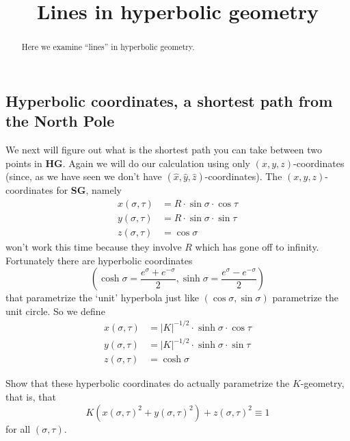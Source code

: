 \documentclass{ximera}
\title{Lines in hyperbolic geometry}
\begin{document}
\begin{abstract}
Here we examine ``lines'' in hyperbolic geometry.
\end{abstract}
\maketitle

\subsection*{Hyperbolic coordinates, a shortest path from the North Pole}

We next will figure out what is the shortest path you can take between
two points in \textbf{HG}. Again we will do our calculation using only
$\left( x,y,z\right) $-coordinates (since, as we have seen we don't
have $\left( \hat{x},\hat{y},\hat{z}\right) $-coordinates). The
$\left( x,y,z\right) $-coordinates for \textbf{SG}, namely
\begin{align*}
x\left(  \sigma,\tau\right)   &  =R\cdot \sin %
\sigma\cdot \cos \tau\\
y\left(  \sigma,\tau\right)   &  =R\cdot \sin %
\sigma\cdot \sin \tau\\
z\left(  \sigma,\tau\right)   &  =\cos \sigma
\end{align*}
won't work this time because they involve $R$ which has gone off to infinity.
Fortunately there are hyperbolic coordinates%
\[
\left(  \cosh \sigma=\frac{e^{\sigma}+e^{-\sigma}}{2},\sinh %
\sigma=\frac{e^{\sigma}-e^{-\sigma}}{2}\right)
\]
that parametrize the `unit' hyperbola just like $\left(  \cos %
\sigma,\sin \sigma\right)  $ parametrize the unit circle. So we define%
\begin{align*}
x\left(  \sigma,\tau\right)   &  =\left\vert K\right\vert ^{-1/2}%
\cdot \sinh \sigma\cdot\cos \tau\\
y\left(  \sigma,\tau\right)   &  =\left\vert K\right\vert ^{-1/2}%
\cdot \sinh \sigma\cdot\sin \tau\\
z\left(  \sigma,\tau\right)   &  =\cosh \sigma
\end{align*}


\begin{exercise}
Show that these hyperbolic coordinates do actually parametrize
the $K$-geometry, that is, that%
\[
K\left(  x\left(  \sigma,\tau\right)  ^{2}+y\left(  \sigma,\tau\right)
^{2}\right)  +z\left(  \sigma,\tau\right)  ^{2}\equiv1
\]
for all $\left(  \sigma,\tau\right)  $.
\end{exercise}
\end{document}
